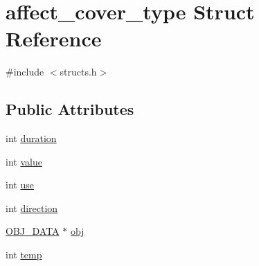 \hypertarget{structaffect__cover__type}{\section{affect\-\_\-cover\-\_\-type Struct Reference}
\label{structaffect__cover__type}
}


{\ttfamily \#include $<$structs.\-h$>$}

\subsection*{Public Attributes}
\begin{DoxyCompactItemize}
\item 
int \hyperlink{structaffect__cover__type_aa94d0914f5a09c6e08771751723a885e}{duration}
\item 
int \hyperlink{structaffect__cover__type_a94ce13ff419fda541dd1735b746d5c88}{value}
\item 
int \hyperlink{structaffect__cover__type_aacd2e9cac687efcfece092cfb42577a2}{use}
\item 
int \hyperlink{structaffect__cover__type_a05a8e09728ca7c19c047b3a05cdafd26}{direction}
\item 
\hyperlink{structs_8h_aaa59141dfc8c6ecdb6bfcf1537dd52d1}{O\-B\-J\-\_\-\-D\-A\-T\-A} $\ast$ \hyperlink{structaffect__cover__type_ac87ca859fc436a25a97ad7c8356ae7f3}{obj}
\item 
int \hyperlink{structaffect__cover__type_aaa1b0b9d8101ccbcb84c21f7334d15b9}{temp}
\end{DoxyCompactItemize}


